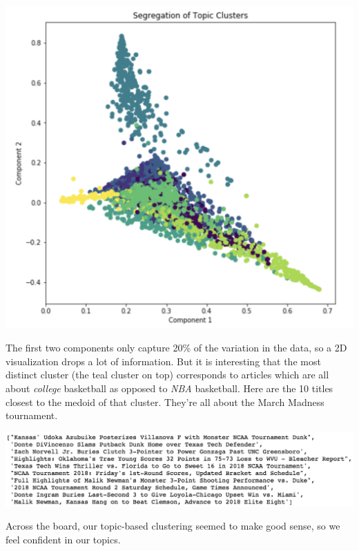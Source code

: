 \documentclass[11pt]{article}
\begin{document}
\begin{center}
\includegraphics[scale=0.5]{svd_clusters.png}
\end{center}

The first two components only capture 20\% of the variation in the data, so a 2D visualization drops a lot of information.  But it is interesting that the most distinct cluster (the teal cluster on top) corresponds to articles which are all about \textit{college} basketball as opposed to \textit{NBA} basketball. Here are the 10 titles closest to the medoid of that cluster.  They're all about the March Madness tournament. 

\includegraphics[width=400pt]{college_medoid_closest10.png} 

Across the board, our topic-based clustering seemed to make good sense, so we feel confident in our topics. 

\end{document}
